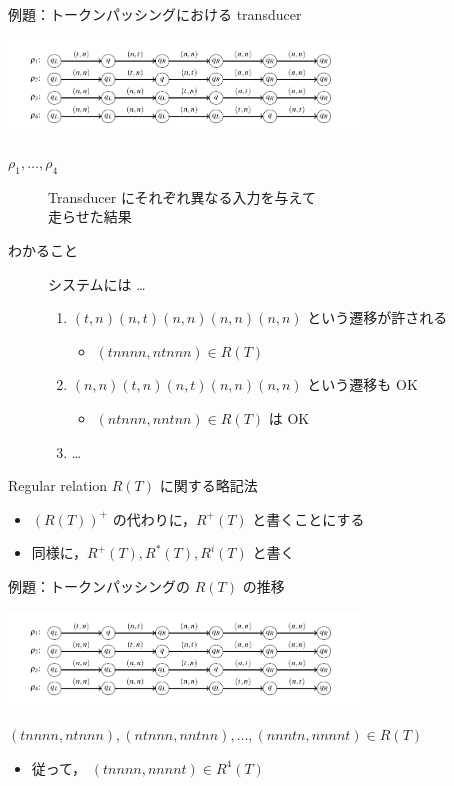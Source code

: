 \documentclass[presentation, xetex]{beamer}
\begin{document}
\begin{frame}[label={sec:orgd4e213e}]{例題：トークンパッシングにおける transducer}
\begin{center}
\includegraphics[width=0.7\textwidth]{./images/four-transducer.png}
\end{center}


\begin{description}
\item[{\(\rho_1, \dots, \rho_4\)}] Transducer にそれぞれ異なる入力を与えて\\
走らせた結果
\item[{わかること}] システムには \dots{}
\begin{enumerate}
\item \((t, n)(n, t)(n, n)(n, n)(n, n)\) という遷移が許される
\begin{itemize}
\item \((tnnnn, ntnnn) \in R(T)\)
\end{itemize}
\item \((n, n)(t, n)(n, t)(n, n)(n, n)\) という遷移も OK
\begin{itemize}
\item \((ntnnn, nntnn) \in R(T)\) は OK
\end{itemize}
\item \dots{}
\end{enumerate}
\end{description}
\end{frame}


\begin{frame}[label={sec:org25b9cdf}]{Regular relation \(R(T)\) に関する略記法}
\begin{itemize}
\item \((R(T))^+\) の代わりに，\(R^+(T)\) と書くことにする
\item 同様に，\(R^+(T), R^*(T), R^i(T)\) と書く
\end{itemize}
\end{frame}


\begin{frame}[label={sec:org4e3539e}]{例題：トークンパッシングの \(R(T)\) の推移}
\begin{center}
\includegraphics[width=0.7\textwidth]{./images/four-transducer.png}
\end{center}

\((tnnnn, ntnnn), (ntnnn, nntnn), \dots, (nnntn, nnnnt) \in R(T)\)
\begin{itemize}
\item 従って， \((tnnnn, nnnnt) \in R^4(T)\)
\end{itemize}
\end{frame}
\end{document}
